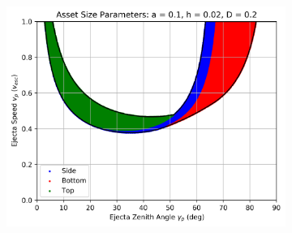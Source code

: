 \documentclass{article}
\begin{document}
\begin{figure}
	\begin{subfigure}[t]{.32\textwidth}
		\centering
		\includegraphics[width=.98\linewidth]{asset_speed_zenith_plot_1.100e+00_1.000e-01_2.000e-02_2.000e-01.png}  
		\label{fig:sub-asset_speed_zenith_h2_9}
	\end{subfigure}
	

\end{figure}
\end{document}
